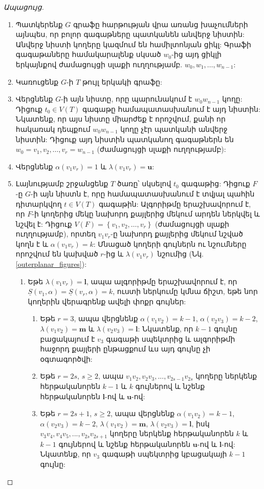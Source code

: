 \begin{proof}[Ապացույց]
\begin{enumerate}
\item Պատկերենք $G$ գրաֆը հարթության վրա առանց խաչումների այնպես, որ բոլոր գագաթները պատկանեն անվերջ նիստին: Անվերջ նիստի կողերը կազմում են համիլտոնյան ցիկլ: Գրաֆի գագաթաները համակարալենք սկսած $w_0$-ից այդ ցիկլի երկայնքով ժամացույցի սլաքի ուղղությամբ. $w_0, w_1, \ldots, w_{n-1}$:
\item Կառուցենք $G$-ի $T$ թույլ երկակի գրաֆը:
\item Վերցնենք $G$-ի այն նիստը, որը պարունակում է $w_0w_{n-1}$ կողը: Դիցուք $t_0 \in V(T)$ գագաթը համապատասխանում է այդ նիստին: Նկատենք, որ այս նիստը միարժեք է որոշվում, քանի որ հակառակ դեպքում $w_0w_{n-1}$ կողը չէր պատկանի անվերջ նիստին: Դիցուք այդ նիստին պատկանող գագաթներն են $w_0=v_1,v_2,\ldots,v_r=w_{n-1}$ (ժամացույցի սլաքի ուղղությամբ):
\item Վերցնենք $\alpha(v_1v_r) = 1$ և $\lambda(v_1v_r)=\bm{u}$: \label{algo_set_first}
\item Լայնությամբ շրջանցենք $T$ ծառը՝ սկսելով $t_0$ գագաթից: Դիցուք $F$-ը $G$-ի այն նիստն է, որը համապատասխանում է տվյալ պահին դիտարկվող $t \in V(T)$ գագաթին: Ալգորիթմը երաշխավորում է, որ $F$-ի կողերից մեկը նախորդ քայլերից մեկում արդեն ներկվել և նշվել է: Դիցուք $V(F) = \left\{v_1,v_2,\ldots,v_r\right\}$ (ժամացույցի սլաքի ուղղությամբ), որտեղ $v_1v_r$-ը նախորդ քայլերից մեկում նշված կողն է և $\alpha(v_1v_r)=k$: Մնացած կողերի գույներն ու նշումները որոշվում են կախված $r$-ից և $\lambda(v_1v_r)$ նշումից (Նկ. \ref{outerplanar_figures}): \label{algo_traverse}
	\begin{enumerate}
    \item Եթե $\lambda(v_1v_r)=\bm{l}$, ապա ալգորիթմը երաշխավորում է, որ $\underline{S}(v_1, \alpha) = \underline{S}(v_r, \alpha) = k$, ուստի ներկումը կմնա ճիշտ, եթե նոր կողերին վերագրենք ավելի փոքր գույներ:
    	\begin{enumerate}
    	\item Եթե $r=3$, ապա վերցնենք $\alpha(v_1v_2)=k-1$, $\alpha(v_2v_3)=k-2$, $\lambda(v_1v_2)=\bm{m}$ և $\lambda(v_2v_3)=\bm{l}$: Նկատենք, որ $k-1$ գույնը բացակայում է $v_3$ գագաթի սպեկտրից և ալգորիթմի հաջորդ քայլերի ընթացքում ևս այդ գույնը չի օգտագործվի: \label{step3l}
        \item Եթե $r=2s$, $s\geq 2$, ապա $v_1v_2, v_2v_3, ..., v_{2s-1}v_{2s}$ կողերը ներկենք հերթականորեն $k-1$ և $k$ գույներով և նշենք հերթականորեն $\bm{l}$-ով և $\bm{u}$-ով: \label{step4l}
        \item Եթե $r=2s+1$, $s\geq 2$, ապա վերցնենք $\alpha(v_1v_2)=k-1$, $\alpha(v_2v_3)=k-2$, $\lambda(v_1v_2)=\bm{m}$, $\lambda(v_2v_3)=\bm{l}$, իսկ $v_3v_4, v_4v_5, ..., v_{2s}v_{2s+1}$ կողերը ներկենք հերթականորեն $k$ և $k-1$ գույներով և նշենք հերթականորեն $\bm{u}$-ով և $\bm{l}$-ով: Նկատենք, որ $v_3$ գագաթի սպեկտրից կբացակայի $k-1$ գույնը:\label{step5l}
    	\end{enumerate}
    

\end{enumerate}
\end{enumerate}
\end{proof}
